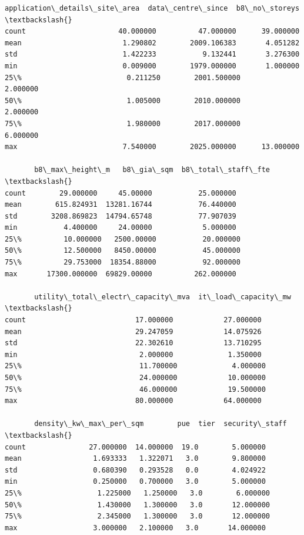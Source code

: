 \documentclass[11pt]{article}
\makeatletter
\newcommand{\boxspacing}{\kern\kvtcb@left@rule\kern\kvtcb@boxsep}
\newcommand{\prompt}[4]{
        {\ttfamily\llap{{\color{#2}[#3]:\hspace{3pt}#4}}\vspace{-\baselineskip}}
    }
\makeatother
\begin{document}
            \begin{tcolorbox}[breakable, size=fbox, boxrule=.5pt, pad at break*=1mm, opacityfill=0]
\prompt{Out}{outcolor}{5}{\boxspacing}
\begin{Verbatim}[commandchars=\\\{\}]
       application\_details\_site\_area  data\_centre\_since  b8\_no\_storeys  \textbackslash{}
count                      40.000000          47.000000      39.000000
mean                        1.290802        2009.106383       4.051282
std                         1.422233           9.132441       3.276300
min                         0.009000        1979.000000       1.000000
25\%                         0.211250        2001.500000       2.000000
50\%                         1.005000        2010.000000       2.000000
75\%                         1.980000        2017.000000       6.000000
max                         7.540000        2025.000000      13.000000

       b8\_max\_height\_m   b8\_gia\_sqm  b8\_total\_staff\_fte  \textbackslash{}
count        29.000000     45.00000           25.000000
mean        615.824931  13281.16744           76.440000
std        3208.869823  14794.65748           77.907039
min           4.400000     24.00000            5.000000
25\%          10.000000   2500.00000           20.000000
50\%          12.500000   8450.00000           45.000000
75\%          29.753000  18354.88000           92.000000
max       17300.000000  69829.00000          262.000000

       utility\_total\_electr\_capacity\_mva  it\_load\_capacity\_mw  \textbackslash{}
count                          17.000000            27.000000
mean                           29.247059            14.075926
std                            22.302610            13.710295
min                             2.000000             1.350000
25\%                            11.700000             4.000000
50\%                            24.000000            10.000000
75\%                            46.000000            19.500000
max                            80.000000            64.000000

       density\_kw\_max\_per\_sqm        pue  tier  security\_staff  \textbackslash{}
count               27.000000  14.000000  19.0        5.000000
mean                 1.693333   1.322071   3.0        9.800000
std                  0.680390   0.293528   0.0        4.024922
min                  0.250000   0.700000   3.0        5.000000
25\%                  1.225000   1.250000   3.0        6.000000
50\%                  1.430000   1.300000   3.0       12.000000
75\%                  2.345000   1.300000   3.0       12.000000
max                  3.000000   2.100000   3.0       14.000000


\end{Verbatim}
\end{tcolorbox}
\end{document}
